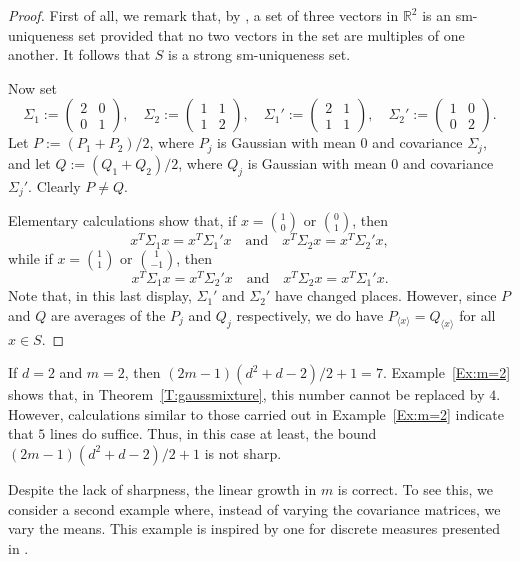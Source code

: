 \documentclass[11pt]{amsart}
\theoremstyle{plain}
\theoremstyle{remark}
\newcommand{\RR}{\mathbb{R}}
\begin{document}
\begin{proof}
First of all, we remark that, by \cite[Corollary~3]{FMR23a},
a set of three vectors in $\RR^2$ is an sm-uniqueness set
provided that no two vectors in the set are multiples of one another.
It follows that $S$ is a strong sm-uniqueness set.

Now set 
\[
\Sigma_1:=
\begin{pmatrix}
2 &0\\
0 &1
\end{pmatrix},
\quad
\Sigma_2:=
\begin{pmatrix}
1 &1\\
1 &2
\end{pmatrix},
\quad
\Sigma_1':=
\begin{pmatrix}
2 &1\\
1 &1
\end{pmatrix},
\quad
\Sigma_2':=
\begin{pmatrix}
1 &0\\
0 &2
\end{pmatrix}.
\]
Let $P:=(P_1+P_2)/2$, where $P_j$ is Gaussian
with mean $0$ and covariance $\Sigma_j$,
and let $Q:=(Q_1+Q_2)/2$, where $Q_j$ is Gaussian
with mean $0$ and covariance $\Sigma_j'$.
Clearly $P\ne Q$.

Elementary calculations show that, if 
$x={1\choose0}$ or ${0\choose1}$, then
\[
x^T\Sigma_1 x=x^T\Sigma_1'x
\quad\text{and}\quad
x^T\Sigma_2 x=x^T\Sigma_2'x,
\]
while if $x={1\choose1}$ or ${1\choose-1}$, then
\[
x^T\Sigma_1 x=x^T\Sigma_2'x
\quad\text{and}\quad
x^T\Sigma_2 x=x^T\Sigma_1'x.
\]
Note that, in this last display, $\Sigma_1'$ and $\Sigma_2'$ have changed places. However, since $P$ and $Q$ are averages of the $P_j$
and $Q_j$ respectively, we do have
$P_{\langle x\rangle}=Q_{\langle x\rangle}$ for all $x\in S$.
\end{proof}

If $d=2$ and $m=2$, then $(2m-1)(d^2+d-2)/2+1=7$.
Example~\ref{Ex:m=2} shows that, in Theorem~\ref{T:gaussmixture},
this number cannot be replaced by $4$. However, calculations
similar to those carried out in Example~\ref{Ex:m=2} indicate that $5$ lines do suffice. Thus, in this case at least, the 
bound $(2m-1)(d^2+d-2)/2+1$  is not sharp.

Despite the lack of sharpness, the linear growth in $m$
is correct. To see this, we consider a second example 
where,
instead of varying the covariance matrices, we vary the means.
This example is inspired by one for discrete measures presented in \cite{He56}.
\end{document}
